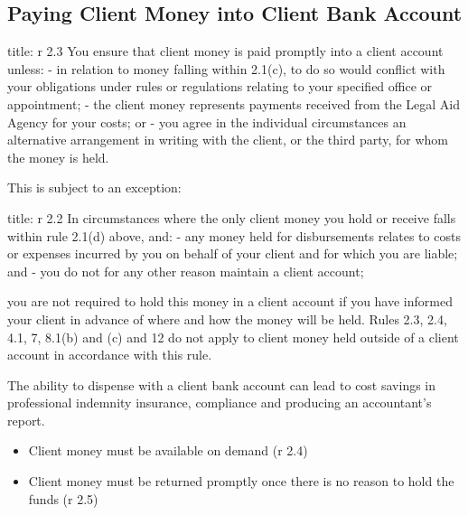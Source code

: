 \documentclass[
]{article}
\newenvironment{Shaded}{}{}
\newcommand{\NormalTok}[1]{#1}
\providecommand{\tightlist}{%
  \setlength{\itemsep}{0pt}\setlength{\parskip}{0pt}}
\begin{document}
\hypertarget{paying-client-money-into-client-bank-account}{%
\subsection{Paying Client Money into Client Bank
Account}\label{paying-client-money-into-client-bank-account}}

\begin{Shaded}
\begin{Highlighting}[]
\NormalTok{title: r 2.3}
\NormalTok{You ensure that client money is paid promptly into a client account unless:}
\NormalTok{{-} in relation to money falling within 2.1(c), to do so would conflict with your obligations under rules or regulations relating to your specified office or appointment;}
\NormalTok{{-} the client money represents payments received from the Legal Aid Agency for your costs; or}
\NormalTok{{-} you agree in the individual circumstances an alternative arrangement in writing with the client, or the third party, for whom the money is held.}
\end{Highlighting}
\end{Shaded}

This is subject to an exception:

\begin{Shaded}
\begin{Highlighting}[]
\NormalTok{title: r 2.2}
\NormalTok{In circumstances where the only client money you hold or receive falls within rule 2.1(d) above, and:}
\NormalTok{{-} any money held for disbursements relates to costs or expenses incurred by you on behalf of your client and for which you are liable; and}
\NormalTok{{-} you do not for any other reason maintain a client account;}

\NormalTok{you are not required to hold this money in a client account if you have informed your client in advance of where and how the money will be held. Rules 2.3, 2.4, 4.1, 7, 8.1(b) and (c) and 12 do not apply to client money held outside of a client account in accordance with this rule.}
\end{Highlighting}
\end{Shaded}

The ability to dispense with a client bank account can lead to cost
savings in professional indemnity insurance, compliance and producing an
accountant's report.

\begin{itemize}
\tightlist
\item
  Client money must be available on demand (r 2.4)
\item
  Client money must be returned promptly once there is no reason to hold
  the funds (r 2.5)
\end{itemize}
\end{document}
